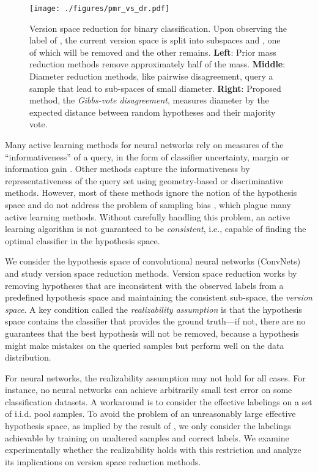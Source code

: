 \documentclass[runningheads, envcountsame, a4paper]{llncs}
\newcommand{\ie}{i.e.}
\begin{document}
\begin{figure}[h]
    \begin{center}
\texttt{[image: ./figures/pmr\_vs\_dr.pdf]}
    \end{center}
    \caption{Version space reduction for binary classification. Upon observing the label of , the current version space is split into subspaces  and , one of which will be removed and the other remains. \textbf{Left}: Prior mass reduction methods remove approximately half of the mass. \textbf{Middle}: Diameter reduction methods, like pairwise disagreement, query a sample that lead to sub-spaces of small diameter. \textbf{Right}: Proposed method, the \textit{Gibbs-vote disagreement}, measures diameter by the expected distance between random hypotheses and their majority vote.}
    \label{fig:pmr_vs_dr}
\end{figure}

Many active learning methods for neural networks rely on measures of the ``informativeness'' of a query, in the form of classifier uncertainty, margin \cite{Joshi09,Ducoffe18} or information gain \cite{Houlsby11,Gal17,Kirsch19}. Other methods capture the informativeness by representativeness of the query set using geometry-based \cite{Sener18} or discriminative \cite{Gissin19} methods. However, most of these methods ignore the notion of the hypothesis space and do not address the problem of sampling bias \cite{Dasgupta09}, which plague many active learning methods. Without carefully handling this problem, an active learning algorithm is not guaranteed to be \textit{consistent}, \ie, capable of finding the optimal classifier in the hypothesis space. 

We consider the hypothesis space of convolutional neural networks (ConvNets) and study version space reduction methods. 
Version space reduction works by removing hypotheses that are inconsistent with the observed labels from a predefined hypothesis space and maintaining the consistent sub-space, the \textit{version space}. A key condition called the \textit{realizability assumption} is that the hypothesis space contains the classifier that provides the ground truth---if not, there are no guarantees that the best hypothesis will not be removed, because a hypothesis might make mistakes on the queried samples but perform well on the data distribution. 

For neural networks, the realizability assumption may not hold for all cases. For instance, no neural networks can achieve arbitrarily small test error on some classification datasets. A workaround is to consider the effective labelings on a set of i.i.d. pool samples. To avoid the problem of an unreasonably large effective hypothesis space, as implied by the result of \cite{Zhang16}, we only consider the labelings achievable by training on unaltered samples and correct labels. 
We examine experimentally whether the realizability holds with this restriction and analyze its implications on version space reduction methods.
\end{document}
